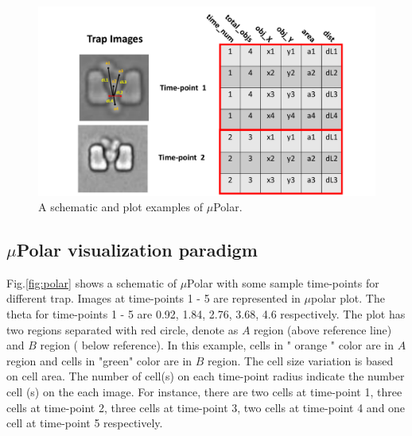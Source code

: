 \documentclass[conference]{IEEEtran}
\begin{document}
\begin{figure}
\centering
\includegraphics[width=\textwidth,height=10 cm]{Patterns/table.pdf}
\caption{ A schematic and plot examples of $\mu$Polar.}
\label{fig:table}
\end{figure}



\subsection{$\mu$Polar visualization paradigm}

Fig.\ref{fig:polar} shows a schematic of $\mu$Polar with some sample time-points for different trap. Images at time-points 1 - 5 are represented in $\mu$polar plot. The theta for time-points 1 - 5 are 0.92, 1.84, 2.76, 3.68, 4.6 respectively. The plot has two regions separated with red circle, denote as $ A $ region (above reference line) and $ B $ region ( below reference). In this example, cells in " orange " color are in $ A $  region and cells in "green" color are in $ B $ region. The cell size variation is based on cell area. The number of cell(s) on each time-point radius indicate the number cell (s) on the each image. For instance, there are two cells at time-point 1, three cells at time-point 2, three cells at time-point 3, two cells at time-point 4 and one cell at time-point 5 respectively. 
\end{document}
